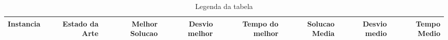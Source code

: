 \begin{landscape}
	\begin{table}[ht]
	\centering
	\begin{tabular}{| c | r | r | r | r | r | r | r |  }
\hline
Instancia&Estado da Arte&Melhor Solucao&Desvio melhor&Tempo do melhor&Solucao Media&Desvio medio&Tempo Medio\\ \hline 
\hline
	\end{tabular}
	\caption{Legenda da tabela}
	\label{seu_label}
	\end{table}
\end{landscape}
